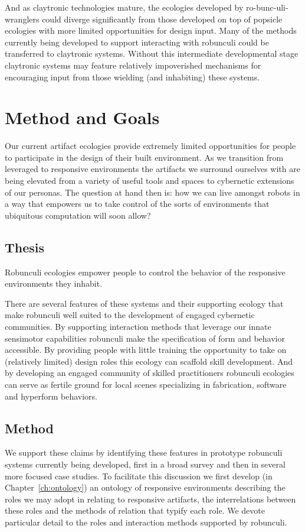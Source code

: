 And as claytronic technologies mature, the ecologies developed by ro{-}bunc{-}uli-wranglers could diverge significantly from those developed on top of popsicle ecologies with more limited opportunities for design input. 
Many of the methods currently being developed to support interacting with robunculi could be transferred to claytronic systems. 
Without this intermediate developmental stage claytronic systems may feature relatively impoverished mechanisms for encouraging input from those wielding (and inhabiting) these systems.

\section{Method and Goals}
%
Our current artifact ecologies provide extremely limited opportunities for people to participate in the design of their built environment. 
As we transition from leveraged to responsive environments the artifacts we surround ourselves with are being elevated from a variety of useful tools and spaces to cybernetic extensions of our personas. 
The question at hand then is: how we can live amongst robots in a way that empowers us to take control of the sorts of environments that ubiquitous computation will soon allow?

\subsection{Thesis}
%
\begin{em}
Robunculi ecologies empower people to control the behavior of the responsive environments they inhabit.
\end{em}

There are several features of these systems and their supporting ecology that make robunculi well suited to the development of engaged cybernetic communities. 
By supporting interaction methods that leverage our innate sensimotor capabilities robunculi make the specification of form and behavior accessible. By providing people with little training the opportunity to take on (relatively limited) design roles this ecology can scaffold skill development. 
And by developing an engaged community of skilled practitioners robunculi ecologies can serve as fertile ground for local scenes specializing in fabrication, software and hyperform behaviors.

\subsection{Method}
%
We support these claims by identifying these features in prototype robunculi systems currently being developed, first in a broad survey and then in several more focused case studies.
To facilitate this discussion we first develop (in Chapter~\ref{ch:ontology}) an ontology of responsive environments describing the roles we may adopt in relating to responsive artifacts, the interrelations between these roles and the methods of relation that typify each role. 
We devote particular detail to the roles and interaction methods supported by robunculi.

